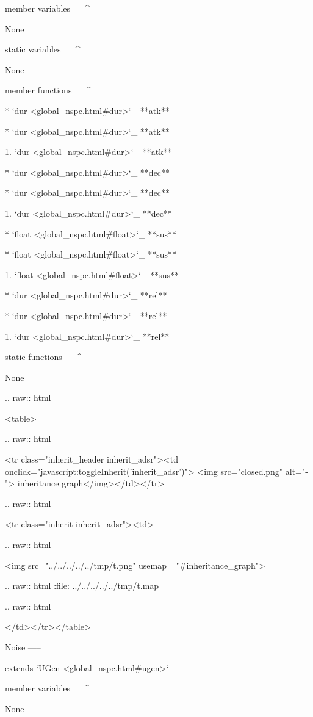 member variables
^^^^^^^^^^^^^^^^

	None

static variables
^^^^^^^^^^^^^^^^

	None

member functions
^^^^^^^^^^^^^^^^

	* `dur <global_nspc.html#dur>`_ **atk**

	* `dur <global_nspc.html#dur>`_ **atk**

		1. `dur <global_nspc.html#dur>`_ **atk**

	* `dur <global_nspc.html#dur>`_ **dec**

	* `dur <global_nspc.html#dur>`_ **dec**

		1. `dur <global_nspc.html#dur>`_ **dec**

	* `float <global_nspc.html#float>`_ **sus**

	* `float <global_nspc.html#float>`_ **sus**

		1. `float <global_nspc.html#float>`_ **sus**

	* `dur <global_nspc.html#dur>`_ **rel**

	* `dur <global_nspc.html#dur>`_ **rel**

		1. `dur <global_nspc.html#dur>`_ **rel**

static functions
^^^^^^^^^^^^^^^^


	None


  .. raw:: html

   <table>


  .. raw:: html

   <tr class="inherit_header inherit_adsr"><td onclick="javascript:toggleInherit('inherit_adsr')"> <img src="closed.png" alt="-"> inheritance graph</img></td></tr>


  .. raw:: html

   <tr class="inherit inherit_adsr"><td>


  .. raw:: html

   <img src="../../../../../tmp/t.png" usemap ="#inheritance_graph">


  .. raw:: html
   :file:   ../../../../../tmp/t.map


  .. raw:: html

   </td></tr></table>

Noise
-----

extends `UGen <global_nspc.html#ugen>`_ 

member variables
^^^^^^^^^^^^^^^^

	None

